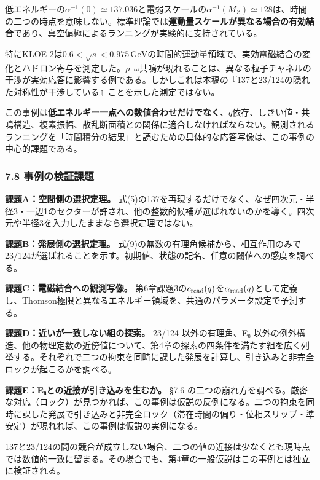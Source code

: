 \documentclass[
  a4paper,
]{ltjsarticle}
\begin{document}
低エネルギーの\(\alpha^{-1}(0)\simeq137.036\)と電弱スケールの\(\alpha^{-1}(M_Z)\simeq128\)は、時間の二つの時点を意味しない。標準理論では\textbf{運動量スケールが異なる場合の有効結合}であり、真空偏極によるランニングが実験的に支持されている。

特にKLOE-2は\(0.6<\sqrt s<0.975\,\mathrm{GeV}\)の時間的運動量領域で、実効電磁結合の変化とハドロン寄与を測定した。\(\rho\)--\(\omega\)共鳴が現れることは、異なる粒子チャネルの干渉が実効応答に影響する例である。しかしこれは本稿の『137と23/124の隠れた対称性が干渉している』ことを示した測定ではない。

この事例は\textbf{低エネルギー一点への数値合わせだけでなく}、\(q\)依存、しきい値・共鳴構造、複素振幅、散乱断面積との関係に適合しなければならない。観測されるランニングを「時間積分の結果」と読むための具体的な応答写像は、この事例の中心的課題である。

\subsubsection{7.8
事例の検証課題}\label{ux4e8bux4f8bux306eux691cux8a3cux8ab2ux984c}

\textbf{課題A：空間側の選択定理。}
式(5)の137を再現するだけでなく、なぜ四次元・半径3・一辺1のセクターが許され、他の整数的候補が選ばれないのかを導く。四次元や半径3を入力したままなら選択定理ではない。

\textbf{課題B：発展側の選択定理。}
式(9)の無数の有理角候補から、相互作用のみで23/124が選ばれることを示す。初期値、状態の記名、任意の閾値への感度を調べる。

\textbf{課題C：電磁結合への観測写像。}
第6章課題3の\(c_{\rm read}(q)\)を\(\alpha_{\rm read}(q)\)として定義し、Thomson極限と異なるエネルギー領域を、共通のパラメータ設定で予測する。

\textbf{課題D：近いが一致しない組の探索。} 23/124 以外の有理角、E₈
以外の例外構造、他の物理定数の近傍値について、第4章の探索の四条件を満たす組を広く列挙する。それぞれで二つの拘束を同時に課した発展を計算し、引き込みと非完全ロックが起こるかを調べる。

\textbf{課題E：E₈との近接が引き込みを生むか。} §7.6
の二つの崩れ方を調べる。厳密な対応（ロック）が見つかれば、この事例は仮説の反例になる。二つの拘束を同時に課した発展で引き込みと非完全ロック（滞在時間の偏り・位相スリップ・準安定）が現れれば、この事例は仮説の実例になる。

137と23/124の間の競合が成立しない場合、二つの値の近接は少なくとも現時点では数値的一致に留まる。その場合でも、第4章の一般仮説はこの事例とは独立に検証される。
\end{document}

